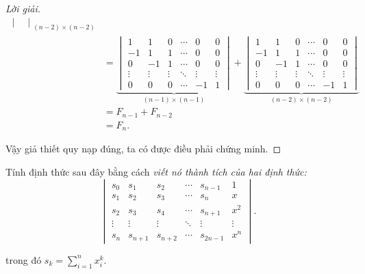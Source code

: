 \documentclass[class=linear-algebra,crop=false]{standalone}
\begin{document}
\begin{proof}[Lời giải]
\begin{align*}
{\begin{vmatrix}
			            \end{vmatrix}}_{(n-2)\times (n-2)} \\
		 & =
		\underbrace{\begin{vmatrix}
				            1      & 1      & 0      & \cdots & 0      & 0      \\
				            -1     & 1      & 1      & \cdots & 0      & 0      \\
				            0      & -1     & 1      & \cdots & 0      & 0      \\
				            \vdots & \vdots & \vdots & \ddots & \vdots & \vdots \\
				            0      & 0      & 0      & \cdots & -1     & 1
			            \end{vmatrix}}_{(n-1)\times (n-1)}
		+
		\underbrace{\begin{vmatrix}
				            1      & 1      & 0      & \cdots & 0      & 0      \\
				            -1     & 1      & 1      & \cdots & 0      & 0      \\
				            0      & -1     & 1      & \cdots & 0      & 0      \\
				            \vdots & \vdots & \vdots & \ddots & \vdots & \vdots \\
				            0      & 0      & 0      & \cdots & -1     & 1
			            \end{vmatrix}}_{(n-2)\times (n-2)} \\
		 & = F_{n-1} + F_{n-2}                                          \\
		 & = F_{n}.
	\end{align*}
	\endgroup{}
	\par Vậy giả thiết quy nạp đúng, ta có được điều phải chứng minh.
\end{proof}

\begin{exercise}
	\par Tính định thức sau đây bằng cách \textit{viết nó thành tích của hai định thức:}
	\[
		\begin{vmatrix}
			s_{0}  & s_{1}   & s_{2}   & \cdots & s_{n-1}  & 1      \\
			s_{1}  & s_{2}   & s_{3}   & \cdots & s_{n}    & x      \\
			s_{2}  & s_{3}   & s_{4}   & \cdots & s_{n+1}  & x^{2}  \\
			\vdots & \vdots  & \vdots  & \ddots & \vdots   & \vdots \\
			s_{n}  & s_{n+1} & s_{n+2} & \cdots & s_{2n-1} & x^{n}
		\end{vmatrix}.
	\]
	\par trong đó $s_{k} = \displaystyle\sum^{n}_{i=1}x_{i}^{k}$.
\end{exercise}
\end{document}
